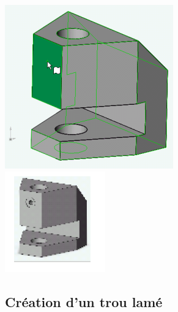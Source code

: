 \begin{minipage}{0.23\linewidth}
\includegraphics[width=0.9\linewidth]{img/020} \\ \vfill
\includegraphics[width=0.9\linewidth]{img/021}
\end{minipage}

\subsection{Création d'un trou lamé}

